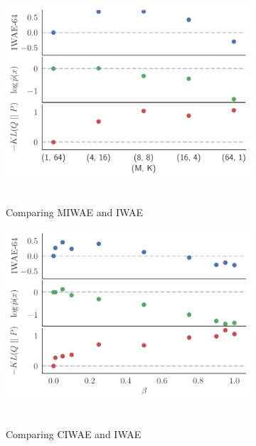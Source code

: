 \begin{figure}[t!]
	\centering
	\begin{subfigure}[b]{0.33\textwidth}
		\centering
		\includegraphics[width=\textwidth]{figures/tighter_bounds/combinations_miwae}\
		\caption{Comparing \gls{MIWAE} and \gls{IWAE} \label{fig:mnistexpt/dotplot/miwae}}
	\end{subfigure}
	\begin{subfigure}[b]{0.33\textwidth}
		\centering
		\includegraphics[width=\textwidth]{figures/tighter_bounds/combinations_combo}\
		\caption{Comparing \gls{CIWAE} and \gls{IWAE} \label{fig:mnistexpt/dotplot/ciwae}}
	\end{subfigure}
	\begin{subfigure}[b]{0.33\textwidth}
		\centering

\end{subfigure}
\end{figure}
